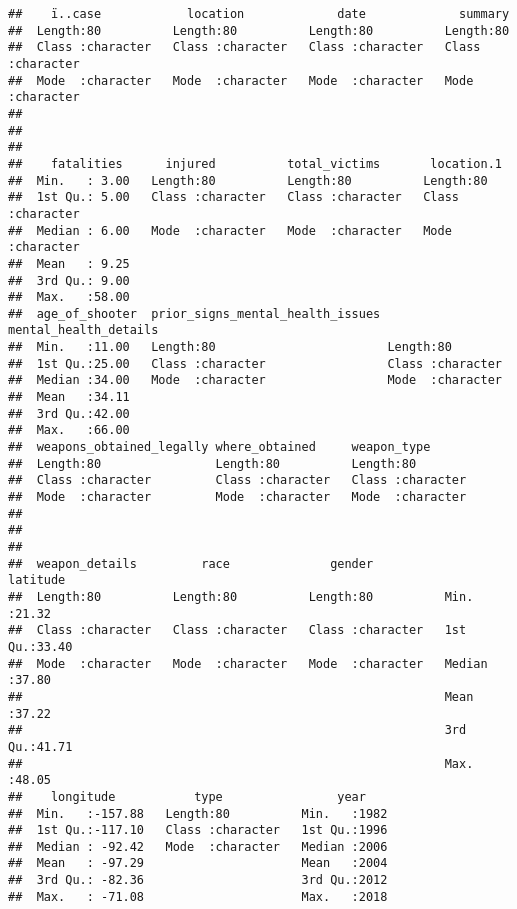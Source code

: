 \documentclass[
]{article}
\begin{document}
\begin{verbatim}
##    ï..case            location             date             summary         
##  Length:80          Length:80          Length:80          Length:80         
##  Class :character   Class :character   Class :character   Class :character  
##  Mode  :character   Mode  :character   Mode  :character   Mode  :character  
##                                                                             
##                                                                             
##                                                                             
##    fatalities      injured          total_victims       location.1       
##  Min.   : 3.00   Length:80          Length:80          Length:80         
##  1st Qu.: 5.00   Class :character   Class :character   Class :character  
##  Median : 6.00   Mode  :character   Mode  :character   Mode  :character  
##  Mean   : 9.25                                                           
##  3rd Qu.: 9.00                                                           
##  Max.   :58.00                                                           
##  age_of_shooter  prior_signs_mental_health_issues mental_health_details
##  Min.   :11.00   Length:80                        Length:80            
##  1st Qu.:25.00   Class :character                 Class :character     
##  Median :34.00   Mode  :character                 Mode  :character     
##  Mean   :34.11                                                         
##  3rd Qu.:42.00                                                         
##  Max.   :66.00                                                         
##  weapons_obtained_legally where_obtained     weapon_type       
##  Length:80                Length:80          Length:80         
##  Class :character         Class :character   Class :character  
##  Mode  :character         Mode  :character   Mode  :character  
##                                                                
##                                                                
##                                                                
##  weapon_details         race              gender             latitude    
##  Length:80          Length:80          Length:80          Min.   :21.32  
##  Class :character   Class :character   Class :character   1st Qu.:33.40  
##  Mode  :character   Mode  :character   Mode  :character   Median :37.80  
##                                                           Mean   :37.22  
##                                                           3rd Qu.:41.71  
##                                                           Max.   :48.05  
##    longitude           type                year     
##  Min.   :-157.88   Length:80          Min.   :1982  
##  1st Qu.:-117.10   Class :character   1st Qu.:1996  
##  Median : -92.42   Mode  :character   Median :2006  
##  Mean   : -97.29                      Mean   :2004  
##  3rd Qu.: -82.36                      3rd Qu.:2012  
##  Max.   : -71.08                      Max.   :2018
\end{verbatim}
\end{document}

